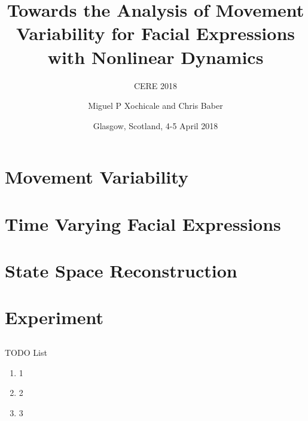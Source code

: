 \documentclass[compress]{beamer}
\title{Towards the Analysis of Movement Variability for Facial Expressions  \\ 
	with Nonlinear Dynamics}
\subtitle{CERE 2018}
\date{Glasgow, Scotland, 4-5 April 2018}
\author{Miguel P Xochicale and Chris Baber}
\institute{School of Engineering \\{\bf University of Birmingham}}
\begin{document}

\maketitle





%
\section{Movement Variability}

\section{Time Varying Facial Expressions}

\section{State Space Reconstruction}








\section{Experiment}



\subsection{}
{
\begin{frame}{TODO List}


          \begin{enumerate}
              \item 1
              \item 2 
              \item 3 
          \end{enumerate}

\end{frame}
}
\end{document}
